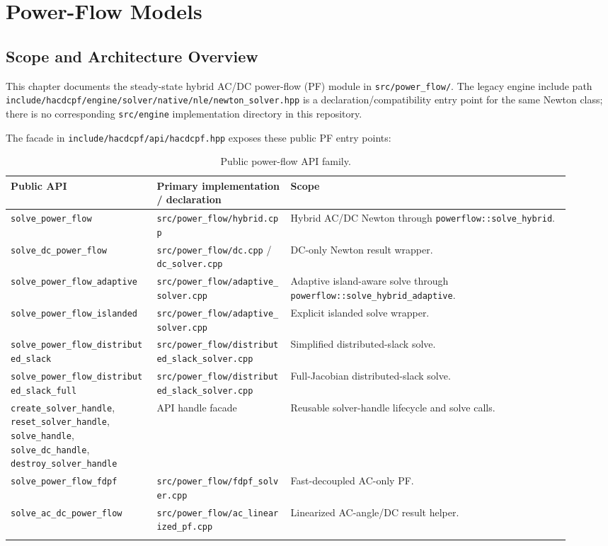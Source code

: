 \section{Power-Flow Models}
\label{sec:powerflow}

\subsection{Scope and Architecture Overview}

This chapter documents the steady-state hybrid AC/DC power-flow (PF) module in
\texttt{src/power\_flow/}.  The legacy engine include path
\texttt{include/hacdcpf/engine/solver/native/nle/newton\_solver.hpp} is a
declaration/compatibility entry point for the same Newton class; there is no
corresponding \texttt{src/engine} implementation directory in this repository.

The facade in \texttt{include/hacdcpf/api/hacdcpf.hpp} exposes these public PF
entry points:

\begin{longtable}{L{0.24\linewidth}L{0.22\linewidth}L{0.46\linewidth}}
\toprule
Public API & Primary implementation / declaration & Scope \\
\midrule
\endhead
\texttt{solve\_power\_flow} & \texttt{src/power\_flow/hybrid.cpp} & Hybrid AC/DC Newton through \texttt{powerflow::solve\_hybrid}. \\
\texttt{solve\_dc\_power\_flow} & \texttt{src/power\_flow/dc.cpp} / \texttt{dc\_solver.cpp} & DC-only Newton result wrapper. \\
\texttt{solve\_power\_flow\_adaptive} & \texttt{src/power\_flow/adaptive\_solver.cpp} & Adaptive island-aware solve through \texttt{powerflow::solve\_hybrid\_adaptive}. \\
\texttt{solve\_power\_flow\_islanded} & \texttt{src/power\_flow/adaptive\_solver.cpp} & Explicit islanded solve wrapper. \\
\texttt{solve\_power\_flow\_distributed\_slack} & \texttt{src/power\_flow/distributed\_slack\_solver.cpp} & Simplified distributed-slack solve. \\
\texttt{solve\_power\_flow\_distributed\_slack\_full} & \texttt{src/power\_flow/distributed\_slack\_solver.cpp} & Full-Jacobian distributed-slack solve. \\
\texttt{create\_solver\_handle}, \texttt{reset\_solver\_handle}, \texttt{solve\_handle}, \texttt{solve\_dc\_handle}, \texttt{destroy\_solver\_handle} & API handle facade & Reusable solver-handle lifecycle and solve calls. \\
\texttt{solve\_power\_flow\_fdpf} & \texttt{src/power\_flow/fdpf\_solver.cpp} & Fast-decoupled AC-only PF. \\
\texttt{solve\_ac\_dc\_power\_flow} & \texttt{src/power\_flow/ac\_linearized\_pf.cpp} & Linearized AC-angle/DC result helper. \\
\bottomrule
\caption{Public power-flow API family.}
\label{tab:pf-api}
\end{longtable}

